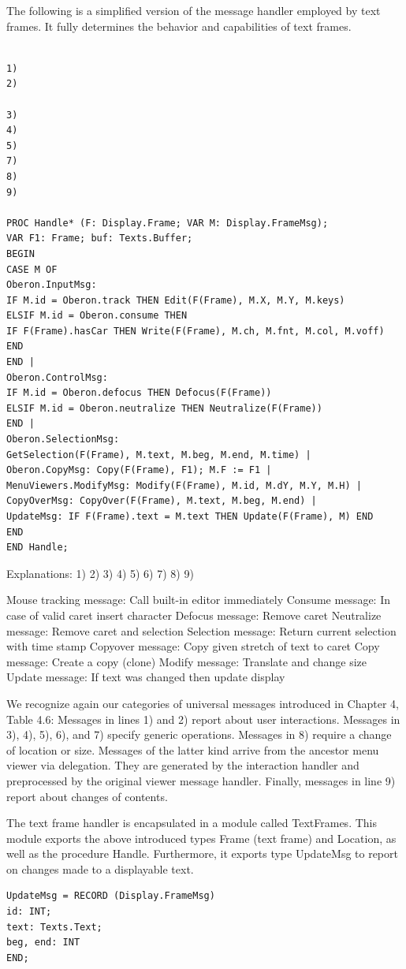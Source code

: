 The following is a simplified version of the message handler employed by text frames. It fully
determines the behavior and capabilities of text frames.
\begin{verbatim}

1)
2)

3)
4)
5)
7)
8)
9)

PROC Handle* (F: Display.Frame; VAR M: Display.FrameMsg);
VAR F1: Frame; buf: Texts.Buffer;
BEGIN
CASE M OF
Oberon.InputMsg:
IF M.id = Oberon.track THEN Edit(F(Frame), M.X, M.Y, M.keys)
ELSIF M.id = Oberon.consume THEN
IF F(Frame).hasCar THEN Write(F(Frame), M.ch, M.fnt, M.col, M.voff) END
END |
Oberon.ControlMsg:
IF M.id = Oberon.defocus THEN Defocus(F(Frame))
ELSIF M.id = Oberon.neutralize THEN Neutralize(F(Frame))
END |
Oberon.SelectionMsg:
GetSelection(F(Frame), M.text, M.beg, M.end, M.time) |
Oberon.CopyMsg: Copy(F(Frame), F1); M.F := F1 |
MenuViewers.ModifyMsg: Modify(F(Frame), M.id, M.dY, M.Y, M.H) |
CopyOverMsg: CopyOver(F(Frame), M.text, M.beg, M.end) |
UpdateMsg: IF F(Frame).text = M.text THEN Update(F(Frame), M) END
END
END Handle;
\end{verbatim}

Explanations:
1)
2)
3)
4)
5)
6)
7)
8)
9)

Mouse tracking message: Call built-in editor immediately
Consume message: In case of valid caret insert character
Defocus message: Remove caret
Neutralize message: Remove caret and selection
Selection message: Return current selection with time stamp
Copyover message: Copy given stretch of text to caret
Copy message: Create a copy (clone)
Modify message: Translate and change size
Update message: If text was changed then update display

We recognize again our categories of universal messages introduced in Chapter 4, Table 4.6:
Messages in lines 1) and 2) report about user interactions. Messages in 3), 4), 5), 6), and 7) specify
generic operations. Messages in 8) require a change of location or size. Messages of the latter kind
arrive from the ancestor menu viewer via delegation. They are generated by the interaction handler
and preprocessed by the original viewer message handler. Finally, messages in line 9) report about
changes of contents.

The text frame handler is encapsulated in a module called TextFrames. This module exports the
above introduced types Frame (text frame) and Location, as well as the procedure Handle.
Furthermore, it exports type UpdateMsg to report on changes made to a displayable text.
\begin{verbatim}
UpdateMsg = RECORD (Display.FrameMsg)
id: INT;
text: Texts.Text;
beg, end: INT
END;
\end{verbatim}

